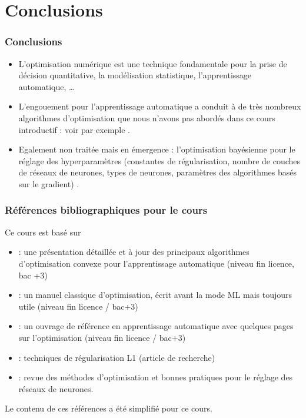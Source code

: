 \documentclass[12pt]{beamer}
\begin{document}
\section*{Conclusions}

\begin{frame}
\frametitle{Conclusions}
\begin{itemize}
\item L’optimisation numérique est une technique fondamentale pour la prise de décision quantitative, la modélisation statistique, l’apprentissage automatique, \ldots
\item L’engouement pour l’apprentissage automatique a conduit à de très nombreux algorithmes d’optimisation que nous n’avons pas abordés dans ce cours introductif : voir par exemple \cite{sun2019survey,sra2012optimization}. 
\item Egalement non traitée mais en émergence : l’optimisation bayésienne pour le réglage des hyperparamètres (constantes de régularisation, nombre de couches de réseaux de neurones, types de neurones, paramètres des algorithmes basés sur le gradient) \cite{snoek2012practical}.
\end{itemize}
\end{frame}

\begin{frame}
\frametitle{Références bibliographiques pour le cours}
{\small
Ce cours est basé sur
\begin{itemize}
\item \cite{ravikumar17} : une présentation détaillée et à jour des principaux algorithmes d’optimisation convexe pour l’apprentissage automatique (niveau fin licence, bac +3)
\item \cite{minoux2008programmation} : un manuel classique d’optimisation, écrit avant la mode ML mais toujours utile (niveau fin licence / bac+3)
\item \cite{bishop2006pattern} : un ouvrage de référence en apprentissage automatique avec quelques pages sur l’optimisation (niveau fin licence / bac+3)
\item \cite{schmidt2007fast} : techniques de régularisation L1 (article de recherche)
\item \cite{sun2019optimization} : revue des méthodes d’optimisation et bonnes pratiques pour le réglage des réseaux de neurones.
\end{itemize}
Le contenu de ces références a été simplifié pour ce cours.
} %
\end{frame}
\end{document}
